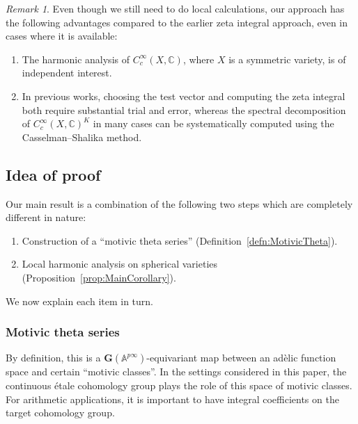 \documentclass{amsart}
\theoremstyle{definition}
\theoremstyle{remark}
\newtheorem{remark}[theorem]{Remark}
\newcommand{\1}{\mathbf{1}}
\newcommand{\A}{\mathbb{A}}
\newcommand{\C}{\mathbb{C}}
\newcommand{\mb}[1]{\mathbf{#1}}
\theoremstyle{definition}
\begin{document}
\begin{remark}
    Even though we still need to do local calculations, our approach has the following advantages compared to the earlier zeta integral approach, even in cases where it is available:
    \begin{enumerate}
        \item The harmonic analysis of $C_c^\infty(X,\C)$, where $X$ is a symmetric variety, is of independent interest.
        \item In previous works, choosing the test vector and computing the zeta integral both require substantial trial and error, whereas the spectral decomposition of $C_c^\infty(X,\C)^K$ in many cases can be systematically computed using the Casselman--Shalika method.
    \end{enumerate}
\end{remark}

\subsection{Idea of proof}
Our main result is a combination of the following two steps which are completely different in nature:
\begin{enumerate}
    \item Construction of a ``motivic theta series'' (Definition~\ref{defn:MotivicTheta}). 
    \item Local harmonic analysis on spherical varieties (Proposition~\ref{prop:MainCorollary}).
\end{enumerate}
We now explain each item in turn.
\subsubsection{Motivic theta series}
By definition, this is a $\mb{G}(\A^{p\infty})$-equivariant map between an ad\`{e}lic function space and certain ``motivic classes''. In the settings considered in this paper, the continuous \'etale cohomology group plays the role of this space of motivic classes. For arithmetic applications, it is important to have integral coefficients on the target cohomology group.
\end{document}
